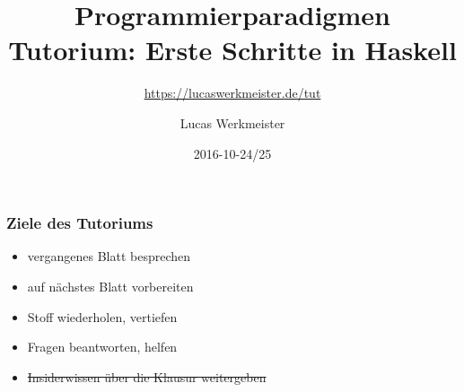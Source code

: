 \documentclass{beamer}
\title[\tiny \copyright 2013 by IPD Snelting -- Programmierparadigmen]{Programmierparadigmen \\ Tutorium: Erste Schritte in Haskell}
\subtitle{\url{https://lucaswerkmeister.de/tut}}
\author{Lucas Werkmeister}
\date{2016-10-24/25}
\begin{document}
\normalsize
\normalem

\begin{frame}[plain]
  \titlepage
\end{frame}

\begin{frame}
  \frametitle{Ziele des Tutoriums}
  \pause
  \begin{itemize}
  \item vergangenes Blatt besprechen
  \item auf nächstes Blatt vorbereiten
  \item Stoff wiederholen, vertiefen
  \item Fragen beantworten, helfen
  \item \sout{Insiderwissen über die Klausur weitergeben}
  \end{itemize}
\end{frame}
\end{document}
